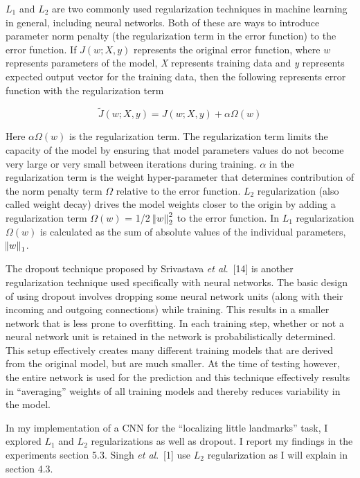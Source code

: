 \documentclass [11pt,letterpaper ,twoside ,openany ]{report}
\begin{document}
    \(L_1\) and \(L_2\) are two commonly used regularization techniques in machine learning in general, including neural networks. Both of these are ways to introduce parameter norm penalty (the regularization term in the error function) to the error function. If \(J(w; X, y) \) represents the original error function, where \(w\) represents parameters of the model, \textit{X} represents training data and \textit{y} represents expected output vector for the training data, then the following represents error function with the regularization term

    \[ \widetilde{J}(w; X, y) = J(w; X, y) + \alpha \Omega(w)   \]

    Here \(\alpha \Omega(w)\) is the regularization term. The regularization term limits the capacity of the model by ensuring that model parameters values do not become very large or very small between iterations during training. \(\alpha\) in the regularization term is the weight hyper-parameter that determines contribution of the norm penalty term \(\Omega\) relative to the error function. \(L_2\) regularization (also called weight decay) drives the model weights closer to the origin by adding a regularization term \( \Omega(w)\) = 1/2 \( \norm{w}^{2}_{2}  \) to the error function. In \(L_1\) regularization \( \Omega(w)\) is calculated as the sum of absolute values of the individual parameters, \( \norm{w}_{1} \). 

    The dropout technique proposed by Srivastava \textit{et al}.\ [14] is another regularization technique used specifically with neural networks. The basic design of using dropout involves dropping some neural network units (along with their incoming and outgoing connections) while training. This results in a smaller network that is less prone to overfitting. In each training step, whether or not a neural network unit is retained in the network is probabilistically determined. This setup effectively creates many different training models that are derived from the original model, but are much smaller. At the time of testing however, the entire network is used for the prediction and this technique effectively results in ``averaging'' weights of all training models and thereby reduces variability in the model.

    In my implementation of a CNN for the ``localizing little landmarks'' task, I explored \(L_1\) and \(L_2\) regularizations as well as dropout. I report my findings in the experiments section 5.3. Singh \textit{et al}.\ [1] use \(L_2\) regularization as I will explain in section 4.3.
\end{document}
